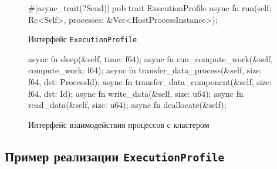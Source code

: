 \documentclass[t]{beamer}  %
\begin{document}
	\begin{frame}[fragile]
		\frametitle{\insertsection} 
		\framesubtitle{\insertsubsection}
		
\begin{figure}[H]
	\centering
	\hspace*{-0.5cm}
	\begin{minipage}{1.15\linewidth}
    \scriptsize
\begin{rustcode}
#[async_trait(?Send)]
pub trait ExecutionProfile {
  async fn run(self: Rc<Self>, processes: &Vec<HostProcessInstance>);
}
\end{rustcode}
	\end{minipage}
\caption*{Интерфейс \texttt{ExecutionProfile}}
\end{figure}

\vspace{-1cm}

\begin{figure}[H]
	\centering
	\hspace*{-0.6cm}
	\begin{minipage}{1.15\linewidth}
    \scriptsize
\begin{rustcode}
async fn sleep(&self, time: f64);
async fn run_compute_work(&self, compute_work: f64);
async fn transfer_data_process(&self, size: f64, dst: ProcessId);
async fn transfer_data_component(&self, size: f64, dst: Id);
async fn write_data(&self, size: u64);
async fn read_data(&self, size: u64);
async fn deallocate(&self);
\end{rustcode}
\end{minipage}
\caption*{Интерфейс взаимодействия процессов с кластером}
\end{figure}

	\end{frame}


	\subsection{Пример реализации \texttt{ExecutionProfile}}
\end{document}
